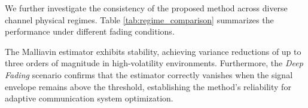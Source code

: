 \documentclass[11pt]{article}
\begin{document}
\begin{table}[htbp]
    \centering
    \footnotesize
    \caption{Variance stability analysis for the volatility gradient $\nabla_{\beta_1} J(\alpha)$. The classical estimator exhibits significant variance growth as $\epsilon \to 0$, whereas the Malliavin estimator remains invariant and stable.}
    \label{tab:variance_reduction}
\end{table}

We further investigate the consistency of the proposed method across diverse channel physical regimes. Table \ref{tab:regime_comparison} summarizes the performance under different fading conditions.

The Malliavin estimator exhibits stability, achieving variance reductions of up to three orders of magnitude in high-volatility environments. Furthermore, the \textit{Deep Fading} scenario confirms that the estimator correctly vanishes when the signal envelope remains above the threshold, establishing the method's reliability for adaptive communication system optimization.
\end{document}
